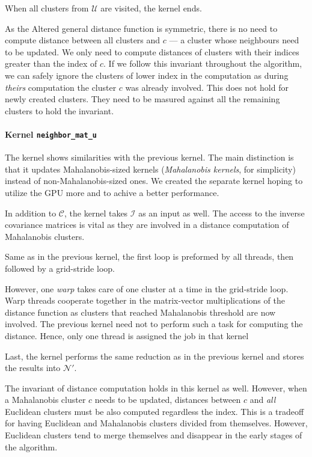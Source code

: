 When all clusters from $\mathcal{U}$ are visited, the kernel ends.

\begin{rem}
	As the Altered general distance function is symmetric, there is no need to compute distance between all clusters and $c$ --- a cluster whose neighbours need to be updated. We only need to compute distances of clusters with their indices greater than the index of $c$. If we follow this invariant throughout the algorithm, we can safely ignore the clusters of lower index in the computation as during \emph{theirs} computation the cluster $c$ was already involved. This does not hold for newly created clusters. They need to be masured against all the remaining clusters to hold the invariant.
\end{rem}

\paragraph{Kernel \texttt{neighbor\_mat\_u}} The kernel shows similarities with the previous kernel. The main distinction is that it updates Mahalanobis-sized kernels (\emph{Mahalanobis kernels}, for simplicity) instead of non-Mahalanobis-sized ones. We created the separate kernel hoping to utilize the GPU more and to achive a better performance.

In addition to $\mathcal{C}$, the kernel takes $\mathcal{I}$ as an input as well. The access to the inverse covariance matrices is vital as they are involved in a distance computation of Mahalanobis clusters. 

Same as in the previous kernel, the first loop is preformed by all threads, then followed by a grid-stride loop. 

However, one \emph{warp} takes care of one cluster at a time in the grid-stride loop. Warp threads cooperate together in the matrix-vector multiplications of the distance function as clusters that reached Mahalanobis threshold are now involved. The previous kernel need not to perform such a task for computing the distance. Hence, only one thread is assigned the job in that kernel

Last, the kernel performs the same reduction as in the previous kernel and stores the results into $\mathcal{N}'$.

\begin{rem}
	The invariant of distance computation holds in this kernel as well. However, when a Mahalanobis cluster $c$ needs to be updated, distances between $c$ and \emph{all} Euclidean clusters must be also computed regardless the index. This is a tradeoff for having Euclidean and Mahalanobis clusters divided from themselves. However, Euclidean clusters tend to merge themselves and disappear in the early stages of the algorithm.
\end{rem}

